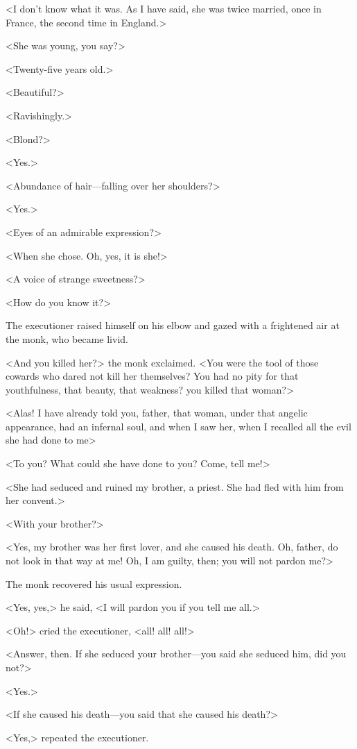 <I don't know what it was. As I have said, she was twice married, once in France, the second time in England.>

<She was young, you say?>

<Twenty-five years old.>

<Beautiful?>

<Ravishingly.>

<Blond?>

<Yes.>

<Abundance of hair—falling over her shoulders?>

<Yes.>

<Eyes of an admirable expression?>

<When she chose. Oh, yes, it is she!>

<A voice of strange sweetness?>

<How do you know it?>

The executioner raised himself on his elbow and gazed with a frightened air at the monk, who became livid.

<And you killed her?> the monk exclaimed. <You were the tool of those cowards who dared not kill her themselves? You had no pity for that youthfulness, that beauty, that weakness? you killed that woman?>

<Alas! I have already told you, father, that woman, under that angelic appearance, had an infernal soul, and when I saw her, when I recalled all the evil she had done to me\longdash>

<To you? What could she have done to you? Come, tell me!>

<She had seduced and ruined my brother, a priest. She had fled with him from her convent.>

<With your brother?>

<Yes, my brother was her first lover, and she caused his death. Oh, father, do not look in that way at me! Oh, I am guilty, then; you will not pardon me?>

The monk recovered his usual expression.

<Yes, yes,> he said, <I will pardon you if you tell me all.>

<Oh!> cried the executioner, <all! all! all!>

<Answer, then. If she seduced your brother—you said she seduced him, did you not?>

<Yes.>

<If she caused his death—you said that she caused his death?>

<Yes,> repeated the executioner.

